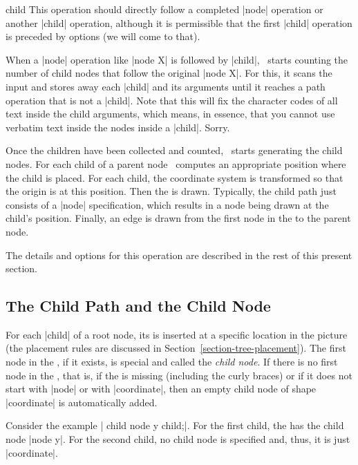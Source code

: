 \begin{pathoperation}{child}{}
  This operation should directly follow a completed |node| operation
  or another |child| operation, although it is permissible that the
  first |child| operation is preceded by options (we will come to
  that).

  When a |node| operation like |node {X}| is followed by |child|,
  \tikzname\ starts counting the number of child nodes that follow the
  original |node {X}|. For this, it scans the input and stores away each
  |child| and its arguments until it reaches a path operation that is
  not a |child|. Note that this will fix the character codes of all
  text inside the child arguments, which means, in essence, that you
  cannot use verbatim text inside the nodes inside a |child|. Sorry. 

  Once the children have been collected and counted, \tikzname\ starts
  generating the child nodes. For each child of a parent node
  \tikzname\ computes an appropriate position where the child is
  placed. For each child, the coordinate system is transformed so that
  the origin is at this position. Then the  is
  drawn. Typically, the child path just consists of a |node|
  specification, which results in a node being drawn at the child's
  position. Finally, an edge is drawn from the first node in the
   to the parent node.
  
  The details and options for this operation are described in the rest
  of this present section.
\end{pathoperation}


\subsection{The Child Path and the Child Node}

For each |child| of a root node, its  is inserted at
a specific location in the picture (the placement rules are discussed
in Section~\ref{section-tree-placement}). The first node in the
, if it exists, is special and called the \emph{child
  node}. If there is no first node in the , that is,
if the  is missing (including the curly braces) or if
it does not start with |node| or with |coordinate|, then an empty
child node of shape |coordinate| is automatically added.

Consider the example | child {node {y}} child;|. For the
first child, the  has the child node |node {y}|. For
the second child, no child node is specified and, thus, it is just
|coordinate|.

